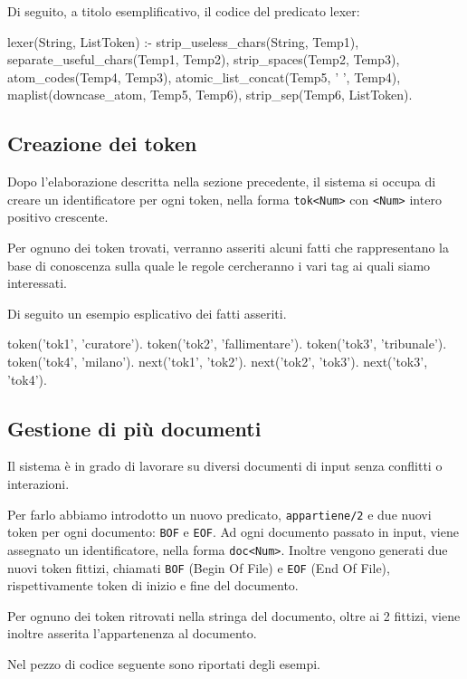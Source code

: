 Di seguito, a titolo esemplificativo, il codice del predicato lexer:

\begin{prologcode}
lexer(String, ListToken) :-
   strip_useless_chars(String, Temp1),
   separate_useful_chars(Temp1, Temp2),
   strip_spaces(Temp2, Temp3),
   atom_codes(Temp4, Temp3),
   atomic_list_concat(Temp5, ' ', Temp4),
   maplist(downcase_atom, Temp5, Temp6),
   strip_sep(Temp6, ListToken).
\end{prologcode}

\subsection{Creazione dei token}
\label{sec:creazionetoken}
Dopo l'elaborazione descritta nella sezione precedente, il sistema si occupa di creare un identificatore per ogni token, nella forma \verb:tok<Num>: con \verb+<Num>+ intero positivo crescente.

Per ognuno dei token trovati, verranno asseriti alcuni fatti che rappresentano la base di conoscenza sulla quale le regole cercheranno i vari tag ai quali siamo interessati.

Di seguito un esempio esplicativo dei fatti asseriti.

\begin{prologcode}
token('tok1', 'curatore').
token('tok2', 'fallimentare').
token('tok3', 'tribunale').
token('tok4', 'milano').
next('tok1', 'tok2').
next('tok2', 'tok3').
next('tok3', 'tok4').
\end{prologcode}


\subsection{Gestione di più documenti}
Il sistema è in grado di lavorare su diversi documenti di input senza conflitti o interazioni.

Per farlo abbiamo introdotto un nuovo predicato, \verb+appartiene/2+ e due nuovi token per ogni documento: \verb+BOF+ e \verb+EOF+.
Ad ogni documento passato in input, viene assegnato un identificatore, nella forma \verb:doc<Num>:. Inoltre vengono generati due nuovi token fittizi, chiamati \verb+BOF+ (Begin Of File) e \verb+EOF+ (End Of File), rispettivamente token di inizio e fine del documento.

Per ognuno dei token ritrovati nella stringa del documento, oltre ai 2 fittizi, viene inoltre asserita l'appartenenza al documento.

Nel pezzo di codice seguente sono riportati degli esempi.


